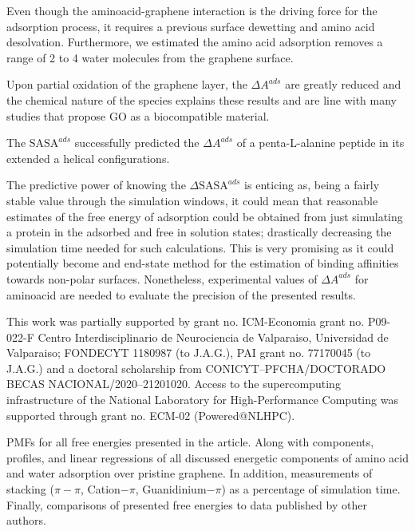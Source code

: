 \documentclass[journal=jcisd8,manuscript=article,layout=twocolumn]{achemso}
\begin{document}
Even though the aminoacid-graphene interaction is the driving force for the adsorption process, it requires a previous surface dewetting and amino acid desolvation.
Furthermore, we estimated the amino acid adsorption removes a range of 2 to 4 water molecules from the graphene surface.

Upon partial oxidation of the graphene layer, the $\Delta A^{ads}$ are greatly reduced and the chemical nature of the species explains these results and are line with many studies that propose GO as a biocompatible material.

The $\textrm{SASA}^{ads}$ successfully predicted the $\Delta A^{ads}$ of a penta-L-alanine peptide in its extended a helical configurations.

The predictive power of knowing the $\Delta \textrm{SASA}^{ads}$ is enticing as, being a fairly stable value through the simulation windows, it could mean that reasonable estimates of the free energy of adsorption could be obtained from just simulating a protein in the adsorbed  and free in solution states; drastically decreasing the simulation time needed for such calculations. This is very promising as it could potentially become and end-state method for the estimation of binding affinities towards non-polar surfaces. Nonetheless, experimental values of $\Delta A^{ads}$ for aminoacid are needed to evaluate the precision of the presented results.

\begin{acknowledgement}
This work was partially supported by grant no. ICM-Economia grant no. P09-022-F Centro Interdisciplinario de Neurociencia de Valparaiso, Universidad de Valparaiso; FONDECYT 1180987 (to J.A.G.), PAI grant no. 77170045 (to J.A.G.) and a doctoral scholarship from CONICYT--PFCHA/DOCTORADO BECAS NACIONAL/2020--21201020.
Access to the supercomputing infrastructure of the National Laboratory for High-Performance Computing was supported through grant no. ECM-02 (Powered@NLHPC).
\end{acknowledgement}

\begin{suppinfo}
PMFs for all free energies presented in the article.
Along with components, profiles, and linear regressions of all discussed energetic components of amino acid and water adsorption over pristine graphene.
In addition, measurements of stacking ($\pi-\pi$, Cation$-\pi$, Guanidinium$-\pi$) as a percentage of simulation time.
Finally, comparisons of presented free energies to data published by other authors.
\end{suppinfo}



%
\end{document}
